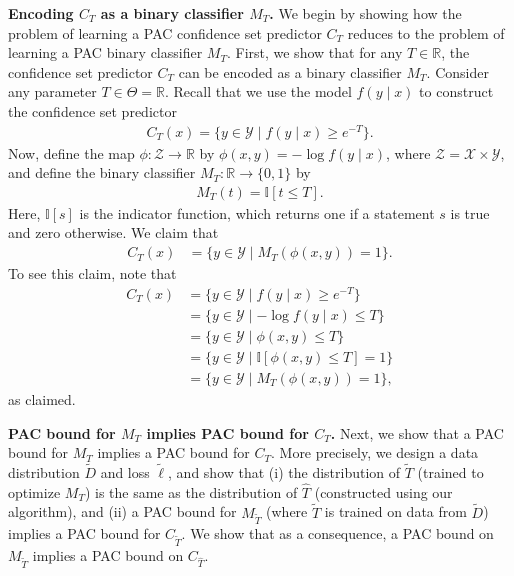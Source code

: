 \documentclass{article} \usepackage{iclr2020_conference,times}
\renewcommand{\(}						{\left(}
\renewcommand{\)}						{\right)}
\renewcommand{\[}						{\left[}
\renewcommand{\]}						{\right]}
\newcommand{\<}						{\left<}
\renewcommand{\>}						{\right>}
\def\Xs{\mathcal{{X}}}
\def\Ys{\mathcal{{Y}}}
\def\Zs{\mathcal{{Z}}}
\begin{document}
\textbf{Encoding $C_T$ as a binary classifier $M_T$.}
We begin by showing how the problem of learning a PAC confidence set predictor $C_T$ reduces to the problem of learning a PAC binary classifier $M_T$.
First, we show that for any $T\in\mathbb{R}$, the confidence set predictor $C_T$ can be encoded as a binary classifier $M_T$.
Consider any parameter $T\in\Theta=\mathbb{R}$. Recall that we use the model $f(y\mid x)$ to construct the confidence set predictor
\begin{align*}
C_T(x) = \{ y \in \Ys \mid f(y \mid x) \geq e^{-T} \}.
\end{align*}
Now, define the map $\phi:\mathcal{Z}\to\mathbb{R}$ by $\phi(x,y)=-\log f(y\mid x)$, where $\Zs = \Xs \times \Ys$, and define the binary classifier $M_T:\mathbb{R}\to\{0,1\}$ by
\begin{align*}
M_T(t)=\mathbb{I}[t\le T].
\end{align*}
Here, $\mathbb{I}[s]$ is the indicator function, which returns one if a statement $s$ is true and zero otherwise.
We claim that
\begin{align} \label{eq:cm_equal}
C_T(x) 
&= \{ y \in \Ys \mid M_T(\phi(x,y)) =1 \}.
\end{align}
To see this claim, note that
\begin{align*}
C_T(x) 
&= \{ y \in \Ys \mid f(y \mid x) \geq e^{-T} \} \\
&= \{ y \in \Ys \mid - \log f(y \mid x) \leq T \} \\
&= \{ y \in \Ys \mid \phi(x,y) \leq T \} \\
&= \{ y \in \Ys \mid \mathbb{I} [ \phi(x,y) \leq T ] =1 \} \\
&= \{ y \in \Ys \mid M_T(\phi(x,y)) =1 \},
\end{align*}
as claimed.


\textbf{PAC bound for $M_T$ implies PAC bound for $C_T$.}
Next, we show that a PAC bound for $M_T$ implies a PAC bound for $C_T$. More precisely, we design a data distribution $\tilde{D}$ and loss $\tilde{\ell}$, and show that (i) the distribution of $\tilde T$ (trained to optimize $M_T$) is the same as the distribution of $\hat T$ (constructed using our algorithm), and (ii) a PAC bound for $M_{\tilde T}$ (where $\tilde T$ is trained on data from $\tilde D$) implies a PAC bound for $C_{\tilde T}$. We show that as a consequence, a PAC bound on $M_{\tilde T}$ implies a PAC bound on $C_{\hat T}$.
\end{document}
